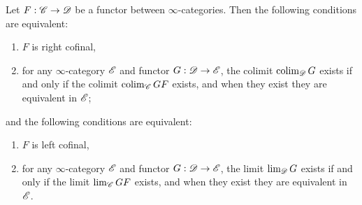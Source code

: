 \documentclass[../../thesis.tex]{subfiles}
\begin{document}
\begin{corollary}
    Let $F : \mathscr{C} \to \mathscr{D}$ be a functor between $\infty$-categories.
    Then the following conditions are equivalent:
    \begin{enumerate}
        \item $F$ is right cofinal,
        \item for any $\infty$-category $\mathscr{E}$ and functor $G:\mathscr{D}\to\mathscr{E}$, the colimit $\operatorname{colim}_{\mathscr{D}}G$ exists if and only if the colimit $\operatorname{colim}_{\mathscr{C}}GF$ exists, and when they exist they are equivalent in $\mathscr{E}$;
    \end{enumerate}
    and the following conditions are equivalent:
    \begin{enumerate}
        \item $F$ is left cofinal,
        \item for any $\infty$-category $\mathscr{E}$ and functor $G:\mathscr{D}\to\mathscr{E}$, the limit $\lim_{\mathscr{D}}G$ exists if and only if the limit $\lim_{\mathscr{C}}GF$ exists, and when they exist they are equivalent in $\mathscr{E}$.
    \end{enumerate}
\end{corollary}
\end{document}
